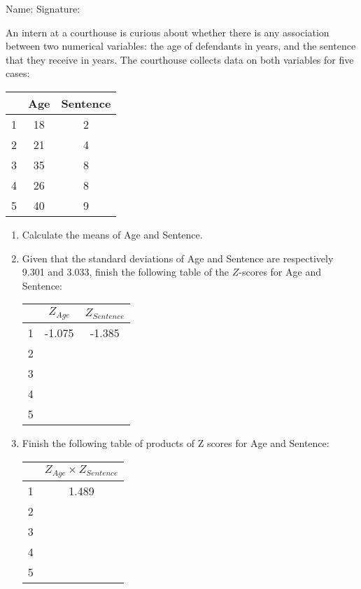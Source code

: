 \documentclass[11pt]{book}\usepackage[]{graphicx}\usepackage[]{color}
\begin{document}
\begin{exercises}
\begin{exercise}
\begin{center}
{{\vspace{4mm}
Name: \underline{\phantom{xxxxxxxxxxxxxxxxxxxxxxxx}} Signature: \underline{\phantom{xxxxxxxxxxxxxxxxxxxxxxxx}}
 }}
\end{center}

An intern at a courthouse is curious about whether there is any association between two numerical variables: the age of defendants in years, and the sentence that they receive in years. The courthouse collects data on both variables for five cases:

\begin{center}
\begin{tabular}{@{} ccc @{}} \hline
  &	Age &	Sentence \\ \hline
1&	18&	2 \\
2&	21&	4 \\
3&	35&	8 \\
4&	26&	8 \\
5&	40&	9 \\ \hline
\end{tabular}
\end{center}

\begin{enumerate}
  \item Calculate the means of Age and Sentence.
  \item	Given that the standard deviations of Age and Sentence are respectively 9.301 and 3.033, finish the following table of the $Z$-scores for Age and Sentence:

{\small{
\begin{center}
\begin{tabular}{@{} ccc @{}} \hline
 &	$Z_{Age}$ &	$Z_{Sentence}$ \\ \hline
1&	-1.075&	-1.385 \\
2& & \\
3& & \\
4& & \\
5& & \\ \hline
\end{tabular}
\end{center}  }}

  \item	Finish the following table of products of Z scores for Age and Sentence:

{\small{
\begin{center}
\begin{tabular}{@{} cc @{}} \hline
 &	$Z_{Age} \times Z_{Sentence}$ \\ \hline
1	& 1.489 \\
2	& \\
3	& \\
4	& \\
5	& \\ \hline
\end{tabular}
\end{center} }}


\end{enumerate}
\end{exercise}
\end{exercises}
\end{document}
